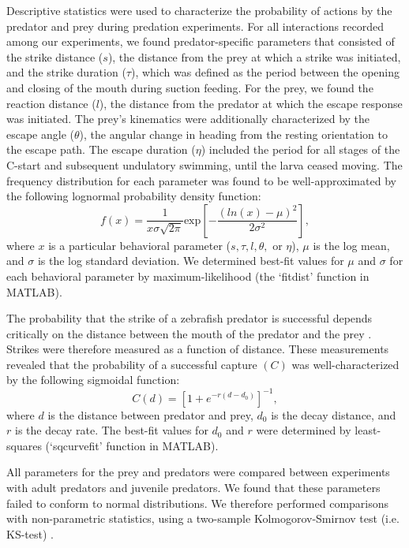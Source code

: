 \documentclass[]{rsos}%
\begin{document}
Descriptive statistics were used to characterize the probability of actions by the predator and prey during predation experiments.
For all interactions recorded among our experiments, we found predator-specific parameters that consisted of the strike distance ($s$), the distance from the prey at which a strike was initiated, and the strike duration ($\tau$), which was defined as the period between the opening and closing of the mouth during suction feeding. 
For the prey, we found the reaction distance ($l$), the distance from the predator at which the escape response was initiated.
The prey's kinematics were additionally characterized by the escape angle ($\theta$), the angular change in heading from the resting orientation to the escape path.
The escape duration ($\eta$) included the period for all stages of the C-start and subsequent undulatory swimming, until the larva ceased moving.
The frequency distribution for each parameter was found to be well-approximated by the following lognormal probability density function:
%
\begin{equation}%
f(x) = \frac{1}{x\sigma \sqrt{2 \pi}} \text{exp} \left[ -{\frac{(ln(x)-\mu)^2}{2\sigma ^2}} \right],
\label{eqn_lognorm}
\end{equation}
%
where $x$ is a particular behavioral parameter ($s, \tau, l, \theta ,$ or $\eta$), $\mu$ is the log mean, and $\sigma$ is the log standard deviation. 
We determined best-fit values for $\mu$ and $\sigma$ for each behavioral parameter by maximum-likelihood (the `fitdist' function in MATLAB).

The probability that the strike of a zebrafish predator is successful depends critically on the distance between the mouth of the predator and the prey \cite{Stewart:2013bha}.
Strikes were therefore measured as a function of distance. 
These measurements revealed that the probability of a successful capture $(C)$ was well-characterized by the following sigmoidal function:
%
\begin{equation}%
C(d) = \left[ 1+e^{-r(d-d_0)} \right]^{-1},
\label{eqn_sig} 
\end{equation}
%
where $d$ is the distance between predator and prey, $d_0$ is the decay distance, and $r$ is the decay rate. 
The best-fit values for $d_0$ and $r$ were determined by least-squares (`sqcurvefit' function in MATLAB).

All parameters for the prey and predators were compared between experiments with adult predators and juvenile predators.
We found that these parameters failed to conform to normal distributions.
We therefore performed comparisons with non-parametric statistics, using a two-sample Kolmogorov-Smirnov test (i.e. KS-test) \cite{MasseyJr:1951jo}. 
\end{document}
